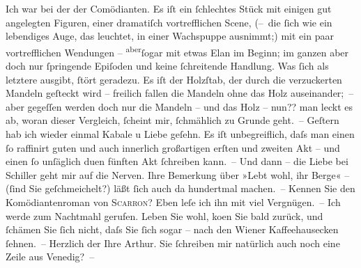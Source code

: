 \begin{ledgroupsized}[t]{13cm}
           Ich war bei der \label{K_L00392-1v}\label{K_L00392-1h} der Comödianten. Es iſt ein ſchlechtes
               Stück mit einigen gut angelegten Figuren, einer dramatiſch {\pb}vortrefflichen Scene, (– die \introOben{}ſich\introOben{} wie ein lebendiges Auge, das leuchtet,  in einer Wachspuppe ausnimmt;) mit ein paar vortrefflichen
               Wendungen – \substVorne{}\textsuperscript{aber}\substDazwischen{}ſogar\substHinten{} mit etwas Elan im Beginn; im ganzen aber doch nur ſpringende Epiſoden und
               keine ſchreitende Handlung. Was ſich als letztere ausgibt, ſtört geradezu. Es iſt der
               Holzſtab, der durch die verzuckerten Mandeln geſteckt wird – freilich fallen die
               Mandeln ohne das Holz auseinander; – aber gegeſſen werden doch nur die Mandeln – und
               das Holz – nun?? man leckt es ab, woran dieser Vergleich, ſcheint mir, {\pb}ſchmählich zu Grunde geht. –\pend
           \pstart
           Geſtern hab ich wieder einmal Kabale u Liebe
               geſehn. Es iſt unbegreiflich, daſs man einen ſo raffinirt guten und auch innerlich
               großartigen erſten und zweiten Akt – und einen ſo unſäglich du{\geminationm}en fünften Akt ſchreiben kann. – Und dann – die Liebe
               bei Schiller geht mir auf die Nerven. Ihre
               Bemerkung über »Lebt wohl, ihr Berge« – (ſind Sie geſchmeichelt?) läßt ſich auch da
               hundertmal machen. –\pend
           \pstart
           Kennen Sie den Komödiantenroman von \textsc{Scarron}? Eben leſe ich ihn mit viel Vergnügen. – Ich werde zum Nachtmahl {\pb}gerufen. Leben Sie wohl, ko{\geminationm}en Sie bald zurück, und ſchämen Sie ſich nicht, daſs
               Sie ſich sogar – nach den Wiener Kaffeehausecken
               ſehnen. –\pend
           \pstart Herzlich der Ihre \spacefill\mbox{Arthur.}\pend{}\pstart
           \noindent{}Sie ſchreiben mir natürlich auch noch eine Zeile aus Venedig? –\pend
           
         
         \endnumbering{}\end{ledgroupsized}  \newcommand{\dateiname}{L00392}\newcommand{\titel}{Arthur Schnitzler an Richard Beer-Hofmann, 26. 10. 1894}\newcommand{\editorInnen}{Martin Anton Müller und Gerd-Hermann Susen}
      